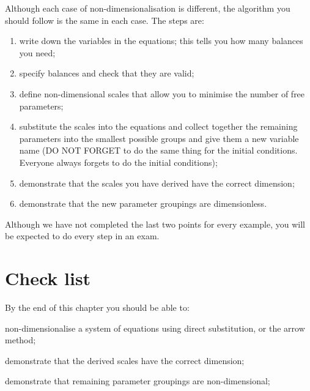 Although each case of non-dimensionalisation is different, the algorithm you should follow is the same in each case. The steps are:
\begin{enumerate}
\item write down the variables in the equations; this tells you how many balances you need;
\item specify balances and check that they are valid;
\item define non-dimensional scales that allow you to minimise the number of free parameters;
\item substitute the scales into the equations and collect together the remaining parameters into the smallest possible groups and give them a new variable name (DO NOT FORGET to do the same thing for the initial conditions. Everyone always forgets to do the initial conditions);
\item demonstrate that the scales you have derived have the correct dimension;
\item demonstrate that the new parameter groupings are dimensionless.
\end{enumerate}
Although we have not completed the last two points for every example, you will be expected to do every step in an exam.
%
%

\section{Check list}
By the end of this chapter you should be able to:
\begin{todolist}
\item non-dimensionalise a system of equations using direct substitution, or the arrow method;
\item demonstrate that the derived scales have the correct dimension;
\item demonstrate that remaining parameter groupings are non-dimensional;
\end{todolist}






